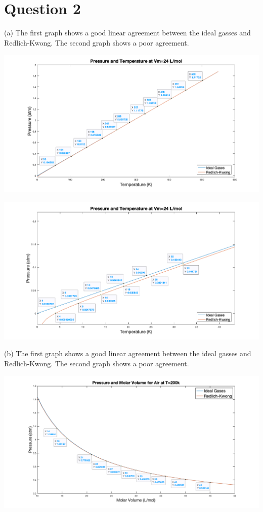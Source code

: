 \documentclass[11pt]{article}
\begin{document}
\section*{Question 2}
(a) The first graph shows a good linear agreement between the ideal gasses and Redlich-Kwong. The second graph shows a poor agreement.  
\begin{center}
    \includegraphics[width=15cm]{2.1.png}
\end{center}
\begin{center}
    \includegraphics[width=15cm]{2.1.1.png}
\end{center}
\newpage
(b) The first graph shows a good linear agreement between the ideal gasses and Redlich-Kwong. The second graph shows a poor agreement.  
\begin{center}
    \includegraphics[width=15cm]{2.2.png}
\end{center}
\end{document}
